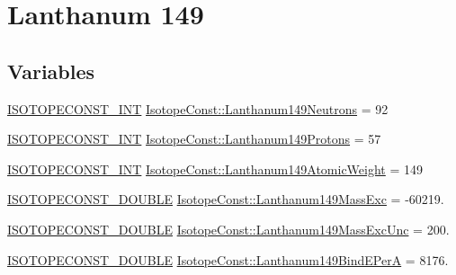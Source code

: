 \hypertarget{group___isotope_const-_lanthanum-_la149}{}\section{Lanthanum 149}
\label{group___isotope_const-_lanthanum-_la149}
\subsection*{Variables}
\begin{DoxyCompactItemize}
\item 
\mbox{\hyperlink{group___isotope_const-_macros_ga5f18360b3e99483a35c32d789e62621c}{I\+S\+O\+T\+O\+P\+E\+C\+O\+N\+S\+T\+\_\+\+I\+NT}} \mbox{\hyperlink{group___isotope_const-_lanthanum-_la149_gaab5f75ee5c44823918014e8c7a38b0d0}{Isotope\+Const\+::\+Lanthanum149\+Neutrons}} = 92
\item 
\mbox{\hyperlink{group___isotope_const-_macros_ga5f18360b3e99483a35c32d789e62621c}{I\+S\+O\+T\+O\+P\+E\+C\+O\+N\+S\+T\+\_\+\+I\+NT}} \mbox{\hyperlink{group___isotope_const-_lanthanum-_la149_ga3883722ddc0db3ec71e3cec780d4093b}{Isotope\+Const\+::\+Lanthanum149\+Protons}} = 57
\item 
\mbox{\hyperlink{group___isotope_const-_macros_ga5f18360b3e99483a35c32d789e62621c}{I\+S\+O\+T\+O\+P\+E\+C\+O\+N\+S\+T\+\_\+\+I\+NT}} \mbox{\hyperlink{group___isotope_const-_lanthanum-_la149_ga8f85479fca0df317d475423debfd08c6}{Isotope\+Const\+::\+Lanthanum149\+Atomic\+Weight}} = 149
\item 
\mbox{\hyperlink{group___isotope_const-_macros_ga8f45a7272ce02c0b4c65c44636ed719a}{I\+S\+O\+T\+O\+P\+E\+C\+O\+N\+S\+T\+\_\+\+D\+O\+U\+B\+LE}} \mbox{\hyperlink{group___isotope_const-_lanthanum-_la149_ga6d27c0c0c2793a720b7c721220d2b591}{Isotope\+Const\+::\+Lanthanum149\+Mass\+Exc}} = -\/60219.
\item 
\mbox{\hyperlink{group___isotope_const-_macros_ga8f45a7272ce02c0b4c65c44636ed719a}{I\+S\+O\+T\+O\+P\+E\+C\+O\+N\+S\+T\+\_\+\+D\+O\+U\+B\+LE}} \mbox{\hyperlink{group___isotope_const-_lanthanum-_la149_ga31b5334b3f2780e34e27c4e5ad50706b}{Isotope\+Const\+::\+Lanthanum149\+Mass\+Exc\+Unc}} = 200.
\item 
\mbox{\hyperlink{group___isotope_const-_macros_ga8f45a7272ce02c0b4c65c44636ed719a}{I\+S\+O\+T\+O\+P\+E\+C\+O\+N\+S\+T\+\_\+\+D\+O\+U\+B\+LE}} \mbox{\hyperlink{group___isotope_const-_lanthanum-_la149_ga512bcdcf18030ac21c98f07a3275d474}{Isotope\+Const\+::\+Lanthanum149\+Bind\+E\+PerA}} = 8176.
\item 

\end{DoxyCompactItemize}
